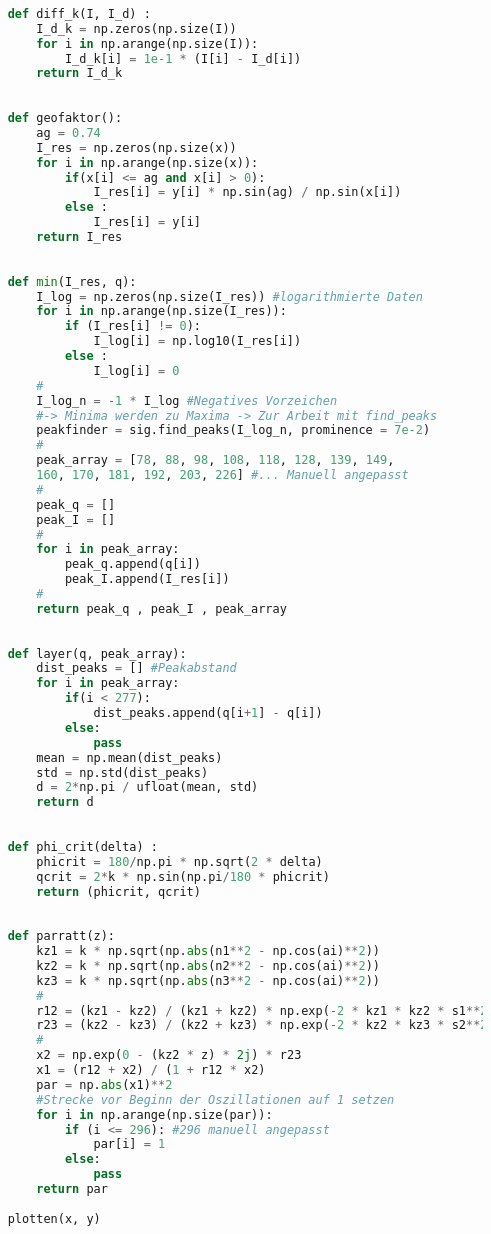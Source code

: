 \begin{lstlisting}[language=Python]
    
    def diff_k(I, I_d) :
        I_d_k = np.zeros(np.size(I))
        for i in np.arange(np.size(I)):
            I_d_k[i] = 1e-1 * (I[i] - I_d[i])
        return I_d_k
    
    
    def geofaktor():
        ag = 0.74
        I_res = np.zeros(np.size(x))
        for i in np.arange(np.size(x)):
            if(x[i] <= ag and x[i] > 0):
                I_res[i] = y[i] * np.sin(ag) / np.sin(x[i])
            else :
                I_res[i] = y[i]
        return I_res
    
    
    def min(I_res, q):
        I_log = np.zeros(np.size(I_res)) #logarithmierte Daten
        for i in np.arange(np.size(I_res)):
            if (I_res[i] != 0):
                I_log[i] = np.log10(I_res[i])
            else :
                I_log[i] = 0
        #
        I_log_n = -1 * I_log #Negatives Vorzeichen 
        #-> Minima werden zu Maxima -> Zur Arbeit mit find_peaks
        peakfinder = sig.find_peaks(I_log_n, prominence = 7e-2)
        #
        peak_array = [78, 88, 98, 108, 118, 128, 139, 149, 
        160, 170, 181, 192, 203, 226] #... Manuell angepasst
        #
        peak_q = []
        peak_I = []
        #
        for i in peak_array:
            peak_q.append(q[i])
            peak_I.append(I_res[i])
        #
        return peak_q , peak_I , peak_array
    
    
    def layer(q, peak_array):
        dist_peaks = [] #Peakabstand
        for i in peak_array:
            if(i < 277):
                dist_peaks.append(q[i+1] - q[i])
            else:
                pass
        mean = np.mean(dist_peaks)
        std = np.std(dist_peaks)
        d = 2*np.pi / ufloat(mean, std)
        return d
    
    
    def phi_crit(delta) :
        phicrit = 180/np.pi * np.sqrt(2 * delta)
        qcrit = 2*k * np.sin(np.pi/180 * phicrit)
        return (phicrit, qcrit)
    
    
    def parratt(z):
        kz1 = k * np.sqrt(np.abs(n1**2 - np.cos(ai)**2))
        kz2 = k * np.sqrt(np.abs(n2**2 - np.cos(ai)**2))
        kz3 = k * np.sqrt(np.abs(n3**2 - np.cos(ai)**2))
        #
        r12 = (kz1 - kz2) / (kz1 + kz2) * np.exp(-2 * kz1 * kz2 * s1**2)
        r23 = (kz2 - kz3) / (kz2 + kz3) * np.exp(-2 * kz2 * kz3 * s2**2)
        #
        x2 = np.exp(0 - (kz2 * z) * 2j) * r23
        x1 = (r12 + x2) / (1 + r12 * x2)
        par = np.abs(x1)**2
        #Strecke vor Beginn der Oszillationen auf 1 setzen
        for i in np.arange(np.size(par)):
            if (i <= 296): #296 manuell angepasst
                par[i] = 1
            else:
                pass
        return par
    
    plotten(x, y)
\end{lstlisting}